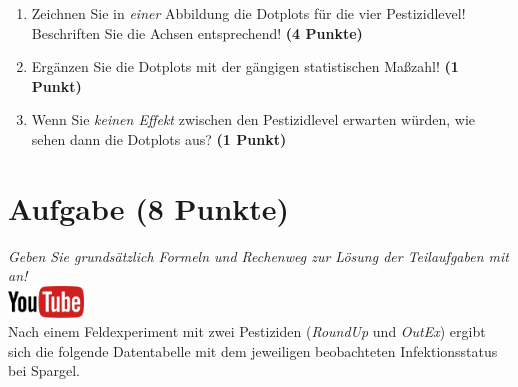 \documentclass[a4paper, 10pt]{scrartcl}\usepackage[]{graphicx}\usepackage[]{xcolor}
\begin{document}
\begin{enumerate}
\item Zeichnen Sie in \textit{einer} Abbildung die Dotplots f{\"u}r die
  vier Pestizidlevel! Beschriften Sie die Achsen entsprechend!
  \textbf{(4 Punkte)}
\item Erg{\"a}nzen Sie die Dotplots mit der g{\"a}ngigen
  statistischen Ma{\ss}zahl! \textbf{(1 Punkt)}
\item Wenn Sie \textit{keinen Effekt} zwischen den Pestizidlevel erwarten
  w{\"u}rden, wie sehen dann die Dotplots aus? \textbf{(1 Punkt)}
\end{enumerate} 
\clearpage

\section{Aufgabe \hfill (8 Punkte)}

\textit{Geben Sie grunds{\"a}tzlich Formeln und Rechenweg zur L{\"o}sung der
  Teilaufgaben mit an!} \\[1Ex]

\hfill\href{https://youtu.be/t_1KL77mfmg}{\includegraphics[width =
  2cm]{img/youtube}}\\[1Ex]

Nach einem Feldexperiment mit zwei Pestiziden (\textit{RoundUp} und
\textit{OutEx}) ergibt sich die folgende Datentabelle mit dem jeweiligen
beobachteten Infektionsstatus bei Spargel.
\end{document}
